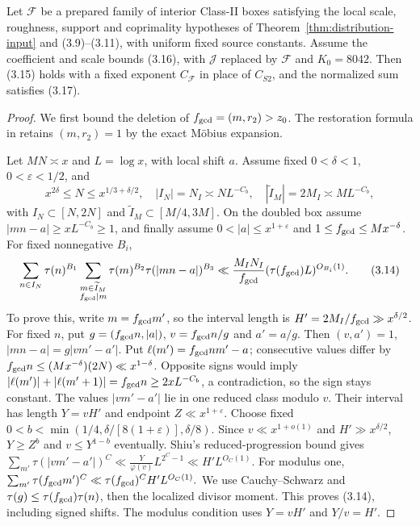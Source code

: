 \begin{lemma}
\label{lem:external-classii-sum}
Let $\mathscr F$ be a prepared family of interior Class-II boxes satisfying
the local scale, roughness, support and coprimality hypotheses of
Theorem~\ref{thm:distribution-input} and (3.9)--(3.11), with uniform fixed
source constants. Assume the coefficient and scale bounds (3.16), with
$\mathcal J$ replaced by $\mathscr F$ and $K_0=8042$. Then (3.15) holds
with a fixed exponent $C_{\mathscr F}$ in place of $C_{S2}$, and the
normalized sum satisfies (3.17).
\end{lemma}
\begin{proof}
We first bound the deletion of $f_{\rm gcd}=(m,r_2)>z_0$.
The restoration formula in \cite[\S3.5, (3.45)]{Z1} retains $(m,r_2)=1$
by the exact M\"obius expansion.

Let $MN\asymp x$ and $L=\log x$, with local shift $a$.
Assume fixed $0<\delta<1$, $0<\varepsilon<1/2$, and
\[
 x^{2\delta}\le N\le x^{1/3+\delta/2},\quad
 |I_N|=N_I\asymp NL^{-C_b},\quad
 |\widetilde I_M|=2M_I\asymp ML^{-C_b},
\]
with $I_N\subset[N,2N]$ and $\widetilde I_M\subset[M/4,3M]$.
On the doubled box assume $|mn-a|\ge xL^{-C_b}\ge1$, and finally assume $0<|a|\le x^{1+\varepsilon}$ and $1\le f_{\rm gcd}\le Mx^{-\delta}$.
For fixed nonnegative $B_i$,
\[
 \sum_{n\in I_N}\tau(n)^{B_1}
 \sum_{\substack{m\in\widetilde I_M\\f_{\rm gcd}\mid m}}
 \tau(m)^{B_2}\tau(|mn-a|)^{B_3}
 \ll\frac{M_IN_I}{f_{\rm gcd}}(\tau(f_{\rm gcd})L)^{O_{B_i}(1)}.
 \tag{3.14}
\]
To prove this, write $m=f_{\rm gcd}m'$, so the interval length is $H'=2M_I/f_{\rm gcd}\gg x^{\delta/2}$.
For fixed $n$, put $g=(f_{\rm gcd}n,|a|)$,
$v=f_{\rm gcd}n/g$ and $a'=a/g$.
Then $(v,a')=1$, $|mn-a|=g|vm'-a'|$.
Put $\ell(m')=f_{\rm gcd}nm'-a$; consecutive values differ by
$f_{\rm gcd}n\le(Mx^{-\delta})(2N)\ll x^{1-\delta}$.
Opposite signs would imply
$|\ell(m')|+|\ell(m'+1)|=f_{\rm gcd}n\ge2xL^{-C_b}$, a contradiction, so the sign stays constant.
The values $|vm'-a'|$ lie in one reduced class modulo $v$.
Their interval has length $Y=vH'$ and endpoint $Z\ll x^{1+\varepsilon}$.
Choose fixed $0<b<\min(1/4,\delta/[8(1+\varepsilon)],\delta/8)$.
Since $v\ll x^{1+o(1)}$ and $H'\gg x^{\delta/2}$,
$Y\ge Z^b$ and $v\le Y^{1-b}$ eventually.
Shiu's reduced-progression bound \cite{Shiu1980} gives
$\sum_{m'}\tau(|vm'-a'|)^C
 \ll\frac{Y}{\varphi(v)}L^{2^C-1}\ll H'L^{O_C(1)}.$
For modulus one,
$\sum_{m'}\tau(f_{\rm gcd}m')^C\ll\tau(f_{\rm gcd})^CH'L^{O_C(1)}.$
We use Cauchy--Schwarz and $\tau(g)\le\tau(f_{\rm gcd})\tau(n)$, then the localized divisor moment.
This proves (3.14), including signed shifts.
The modulus condition uses $Y=vH'$ and $Y/v=H'$.


\end{proof}
